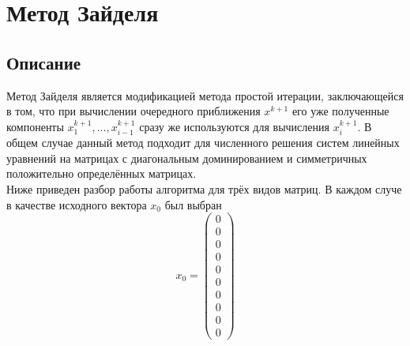 \documentclass[../../report.tex]{subfiles}
\begin{document}
\chapter{Метод Зайделя}

\section{Описание}
Метод Зайделя является модификацией метода простой итерации, заключающейся в том, что при вычислении 
очередного приближения $x^{k+1}$ его уже полученные компоненты $x_1^{k+1},\dots,x_{i-1}^{k+1}$ сразу 
же используются для вычисления $x_i^{k+1}$. В общем случае данный метод подходит для численного решения 
систем линейных уравнений на матрицах с диагональным доминированием и симметричных положительно определённых матрицах. \\
Ниже приведен разбор работы алгоритма для трёх видов матриц. В каждом случе в качестве исходного вектора $x_0$ был выбран 
\[
x_0 = 
\begin{pmatrix} 
  0 \\ 
  0 \\ 
  0 \\ 
  0 \\ 
  0 \\ 
  0 \\ 
  0 \\ 
  0 \\ 
  0 \\ 
  0 
\end{pmatrix}
\]
\end{document}
